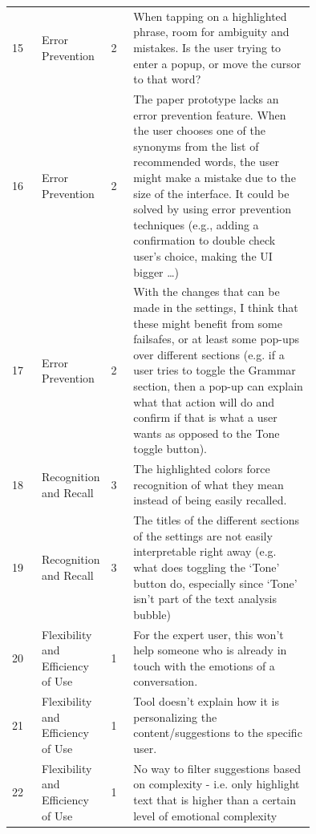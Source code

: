 \documentclass[acmsmall,screen,authorversion,nonacm]{acmart}
\begin{document}
\begin{center}
\begin{longtable}{|l|p{0.15\linewidth}|l|p{0.6\linewidth}|}
15 & Error Prevention & 2 & When tapping on a highlighted phrase, room for ambiguity and mistakes. Is the user trying to enter a popup, or move the cursor to that word? \\ \cline{1-4}
16 & Error Prevention & 2 & The paper prototype lacks an error prevention feature. When the user chooses one of the synonyms from the list of recommended words, the user might make a mistake due to the size of the interface. It could be solved by using error prevention techniques (e.g., adding a confirmation to double check user’s choice, making the UI bigger …) \\ \cline{1-4}
17 & Error Prevention & 2 & With the changes that can be made in the settings, I think that these might benefit from some failsafes, or at least some pop-ups over different sections (e.g. if a user tries to toggle the Grammar section, then a pop-up can explain what that action will do and confirm if that is what a user wants as opposed to the Tone toggle button). \\ \cline{1-4}

18 & Recognition and Recall & 3 & The highlighted colors force recognition of what they mean instead of being easily recalled. \\ \cline{1-4}
19 & Recognition and Recall & 3 & The titles of the different sections of the settings are not easily interpretable right away (e.g. what does toggling the ‘Tone’ button do, especially since ‘Tone’ isn’t part of the text analysis bubble) \\ \cline{1-4}

20 & Flexibility and Efficiency of Use & 1 & For the expert user, this won’t help someone who is already in touch with the emotions of a conversation.  \\ \cline{1-4}
21 & Flexibility and Efficiency of Use & 1 & Tool doesn’t explain how it is personalizing the content/suggestions to the specific user.  \\ \cline{1-4}
22 & Flexibility and Efficiency of Use & 1 & No way to filter suggestions based on complexity - i.e. only highlight text that is higher than a certain level of emotional complexity \\ \cline{1-4}


\end{longtable}
\end{center}
\end{document}
